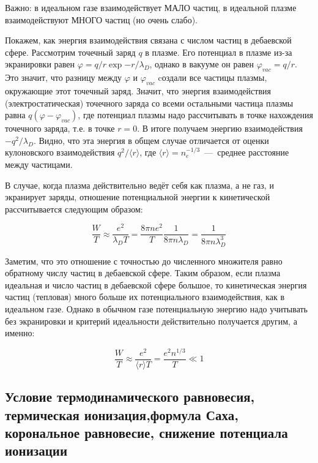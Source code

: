 \documentclass[10pt, a4paper]{article}
\begin{document}
Важно: в идеальном газе взаимодействует МАЛО частиц, в идеальной плазме взаимодействуют МНОГО частиц (но очень слабо).

Покажем, как энергия взаимодействия связана с числом частиц в дебаевской сфере. Рассмотрим точечный заряд $q$ в плазме. Его потенциал в плазме из-за экранировки равен $\varphi = q/r\exp{-r/\lambda_D}$, однако в вакууме он равен $\varphi_{vac}=q/r$. Это значит, что разницу между $\varphi$ и $\varphi_{vac}$ cоздали все частицы плазмы, окружающие этот точечный заряд.
Значит, что энергия взаимодействия (электростатическая) точечного заряда со всеми остальными частица плазмы равна $q (\varphi - \varphi_{vac})$, где потенциал плазмы надо рассчитывать в точке нахождения точечного заряда, т.е. в точке $r=0$. В итоге получаем энергию взаимодействия $-q^2/\lambda_D$.
Видно, что эта энергия в общем случае отличается от оценки кулоновского взаимодействия $q^2/\langle r\rangle$, где $\langle r \rangle = n_e^{-1/3}$~---~среднее расстояние между частицами.

В случае, когда плазма действительно ведёт себя как плазма, а не газ, и экранирует заряды, отношение потенциальной энергии к кинетической рассчитывается следующим образом:

\begin{equation}
	\frac{W}{T} \approx \frac{e^2}{\lambda_D T} = \frac{8\pi n e^2}{T}\frac{1}{8\pi n\lambda_D} = \frac{1}{8\pi n \lambda_D^3}
\end{equation}

Заметим, что это отношение с точностью до численного множителя равно обратному числу частиц в дебаевской сфере. Таким образом, если плазма идеальная и число частиц в дебаевской сфере большое, то кинетическая энергия частиц (тепловая) много больше их потенциального взаимодействия, как в идеальном газе. Однако в обычном газе потенциальную энергию надо учитывать без экранировки и критерий идеальности действительно получается другим, а именно:

\begin{equation}
	\frac{W}{T} \approx \frac{e^2}{\langle r \rangle T} = \frac{e^2 n^{1/3}}{T} \ll 1
\end{equation}

\subsection{Условие термодинамического равновесия, термическая ионизация,\linebreak формула Саха, корональное равновесие, снижение потенциала ионизации}
\end{document}
